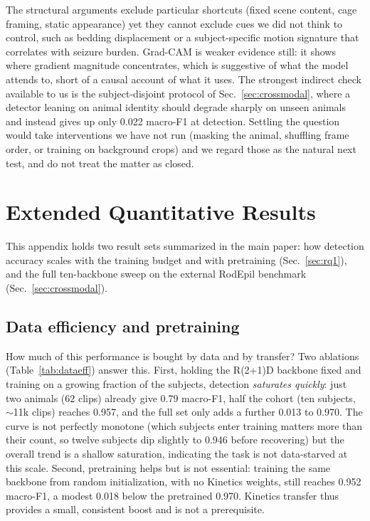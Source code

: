The structural arguments exclude particular shortcuts (fixed scene content, cage
framing, static appearance) yet they cannot exclude cues we did not think to
control, such as bedding displacement or a subject-specific motion signature that
correlates with seizure burden. Grad-CAM is weaker evidence still: it shows where
gradient magnitude concentrates, which is suggestive of what the model attends to, short of a causal account of what it uses. The strongest indirect check available
to us is the subject-disjoint protocol of Sec.~\ref{sec:crossmodal}, where a detector
leaning on animal identity should degrade sharply on unseen animals and instead gives
up only 0.022 macro-F1 at detection. Settling the question would take interventions
we have not run (masking the animal, shuffling frame order, or training on
background crops) and we regard those as the natural next test, and do not treat the matter as closed.

\section{Extended Quantitative Results}
\label{sec:extraresults}

This appendix holds two result sets summarized in the main paper: how detection
accuracy scales with the training budget and with pretraining
(Sec.~\ref{sec:rq1}), and the full ten-backbone sweep on the external RodEpil
benchmark (Sec.~\ref{sec:crossmodal}).

\subsection{Data efficiency and pretraining}
\label{sec:extraresults:dataeff}

How much of this performance is bought by data and by transfer? Two ablations
(Table~\ref{tab:dataeff}) answer this. First, holding the R(2+1)D backbone fixed
and training on a growing fraction of the subjects, detection \emph{saturates
quickly}: just two animals ($62$ clips) already give 0.79 macro-F1, half the
cohort (ten subjects, $\sim$11k clips) reaches 0.957, and the full set only adds a
further 0.013 to 0.970. The curve is not perfectly monotone (which subjects enter
training matters more than their count, so twelve subjects dip slightly to 0.946
before recovering) but the overall trend is a shallow saturation, indicating the
task is not data-starved at this scale. Second, pretraining helps but is not essential: training the same
backbone from random initialization, with no Kinetics weights, still reaches
0.952 macro-F1, a modest 0.018 below the pretrained 0.970. Kinetics transfer thus
provides a small, consistent boost and is not a prerequisite.

